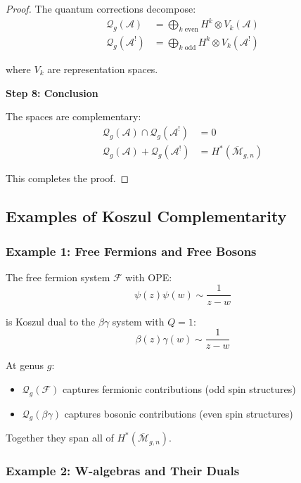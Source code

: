 \begin{proof}
The quantum corrections decompose:
\begin{align}
\mathcal{Q}_g(\mathcal{A}) &= \bigoplus_{k \text{ even}} H^k \otimes V_k(\mathcal{A}) \\
\mathcal{Q}_g(\mathcal{A}^!) &= \bigoplus_{k \text{ odd}} H^k \otimes V_k(\mathcal{A}^!)
\end{align}

where $V_k$ are representation spaces.

\textbf{Step 8: Conclusion}

The spaces are complementary:
\begin{align}
\mathcal{Q}_g(\mathcal{A}) \cap \mathcal{Q}_g(\mathcal{A}^!) &= 0 \\
\mathcal{Q}_g(\mathcal{A}) + \mathcal{Q}_g(\mathcal{A}^!) &= H^*(\overline{\mathcal{M}}_{g,n})
\end{align}

This completes the proof.
\end{proof}

\subsection{Examples of Koszul Complementarity}

\subsubsection{Example 1: Free Fermions and Free Bosons}

The free fermion system $\mathcal{F}$ with OPE:
$$\psi(z)\psi(w) \sim \frac{1}{z-w}$$

is Koszul dual to the $\beta\gamma$ system with $Q = 1$:
$$\beta(z)\gamma(w) \sim \frac{1}{z-w}$$

At genus $g$:
\begin{itemize}
\item $\mathcal{Q}_g(\mathcal{F})$ captures fermionic contributions (odd spin structures)
\item $\mathcal{Q}_g(\beta\gamma)$ captures bosonic contributions (even spin structures)
\end{itemize}

Together they span all of $H^*(\overline{\mathcal{M}}_{g,n})$.

\subsubsection{Example 2: W-algebras and Their Duals}

